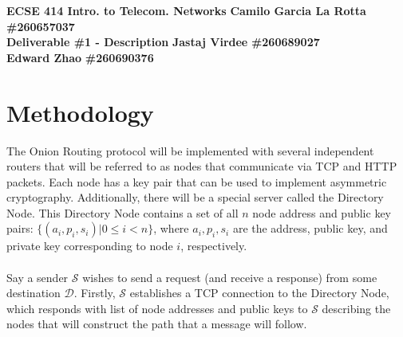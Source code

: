 \documentclass[10pt]{article}
\begin{document}
\noindent
\large \textbf{ECSE 414 Intro. to Telecom. Networks} \hfill \textbf{Camilo Garcia La Rotta} \textbf{\#260657037} \\
\large \textbf{Deliverable \#1 - Description} \hfill \textbf{Jastaj Virdee} \textbf{\#260689027} \\
\text{} \hfill \textbf{Edward Zhao} \textbf{\#260690376}

\section*{Methodology}
The Onion Routing protocol will be implemented with several independent routers
that will be referred to as nodes that communicate via TCP and HTTP packets.
Each node has a key pair that can be used to implement asymmetric cryptography.
Additionally, there will be a special server called the Directory Node. This
Directory Node contains a set of all $n$ node address and public key pairs: $\{(a_i,
p_i, s_i) | 0 \leq i < n\}$, where $a_i, p_i, s_i$ are the address, public key,
and private key corresponding to node $i$, respectively.\\\\
Say a sender $\mathcal{S}$ wishes to send a request (and receive a response)
from some destination $\mathcal{D}$.
Firstly, $\mathcal{S}$ establishes a TCP connection to the Directory Node,
which responds with  list of node addresses and public keys to $\mathcal{S}$ describing the nodes that
will construct the path that a message will follow. \\\\
\end{document}
